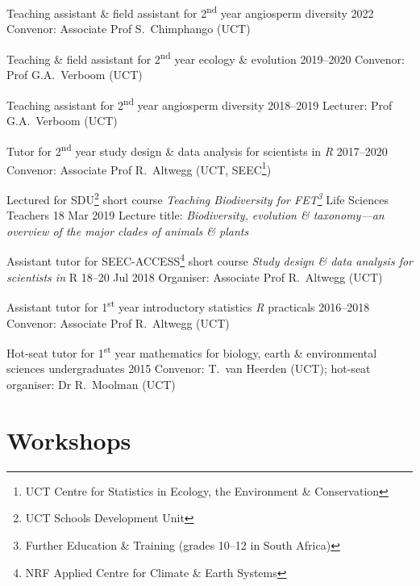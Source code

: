 \documentclass[10pt]{article}
\begin{document}
\begin{hangparas}{2em}{1}

Teaching assistant \& field assistant for 2\textsuperscript{nd} year angiosperm
diversity                                                     \hfill 2022 \break
Convenor: Associate Prof S.~Chimphango (UCT)

Teaching \& field assistant for 2\textsuperscript{nd} year ecology \& evolution
                                                        \hfill 2019--2020 \break
Convenor: Prof G.A.~Verboom (UCT)

Teaching assistant for 2\textsuperscript{nd} year angiosperm diversity
                                                        \hfill 2018--2019 \break
Lecturer: Prof G.A.~Verboom (UCT)

Tutor for 2\textsuperscript{nd} year study design \& data analysis for 
scientists in \textit{R}                                \hfill 2017--2020 \break
Convenor: Associate Prof R.~Altwegg (UCT, SEEC\footnote{UCT Centre for 
Statistics in Ecology, the Environment \& Conservation})

Lectured for SDU\footnote{UCT Schools Development Unit} short course 
\textit{Teaching Biodiversity for FET\footnote{Further Education \& Training
(grades 10--12 in South Africa)}} Life Sciences Teachers
                                                       \hfill 18 Mar 2019 \break
Lecture title: \textit{Biodiversity, evolution \& taxonomy---an overview of the 
major clades of animals \& plants}

Assistant tutor for SEEC-ACCESS\footnote{NRF Applied Centre for Climate \&
Earth Systems} short course \textit{Study design \& data analysis for 
scientists in} R                                   \hfill 18--20 Jul 2018 \break
Organiser: Associate Prof R.~Altwegg (UCT)

Assistant tutor for 1\textsuperscript{st} year introductory statistics
\textit{R} practicals                                   \hfill 2016--2018 \break
Convenor: Associate Prof R.~Altwegg (UCT)

Hot-seat tutor for 1\textsuperscript{st} year mathematics for biology, earth \& 
environmental sciences undergraduates                         \hfill 2015 \break
Convenor: T.~van Heerden (UCT); hot-seat organiser: Dr R.~Moolman (UCT)

\hfill

\end{hangparas}

\section*{Workshops} %
\end{document}
